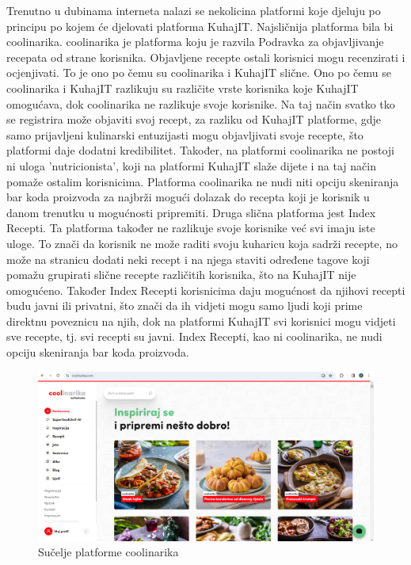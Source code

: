 		Trenutno u dubinama interneta nalazi se nekolicina platformi koje djeluju po principu po kojem će djelovati platforma KuhajIT. Najsličnija platforma bila bi coolinarika. coolinarika je platforma koju je razvila Podravka za objavljivanje recepata od strane korisnika. Objavljene recepte ostali korisnici mogu recenzirati i ocjenjivati. To je ono po čemu su coolinarika i KuhajIT slične. Ono po čemu se coolinarika i KuhajIT razlikuju su različite vrste korisnika koje KuhajIT omogućava, dok coolinarika ne razlikuje svoje korisnike. Na taj način svatko tko se registrira može objaviti svoj recept, za razliku od KuhajIT platforme, gdje samo prijavljeni kulinarski entuzijasti mogu objavljivati svoje recepte, što platformi daje dodatni kredibilitet. Također, na platformi coolinarika ne postoji ni uloga 'nutricionista', koji na platformi KuhajIT slaže dijete i na taj način pomaže ostalim korisnicima. Platforma coolinarika ne nudi niti opciju skeniranja bar koda proizvoda za najbrži mogući dolazak do recepta koji je korisnik u danom trenutku u mogućnosti pripremiti.
		Druga slična platforma jest Index Recepti. Ta platforma također ne razlikuje svoje korisnike već svi imaju iste uloge. To znači da korisnik ne može raditi svoju kuharicu koja sadrži recepte, no može na stranicu dodati neki recept i na njega staviti određene tagove koji pomažu grupirati slične recepte različitih korisnika, što na KuhajIT nije omogućeno. Također Index Recepti korisnicima daju mogućnost da njihovi recepti budu javni ili privatni, što znači da ih vidjeti mogu samo ljudi koji prime direktnu poveznicu na njih, dok na platformi KuhajIT svi korisnici mogu vidjeti sve recepte, tj. svi recepti su javni. Index Recepti, kao ni coolinarika, ne nudi opciju skeniranja bar koda proizvoda.
		
				\begin{figure}[H]
			\includegraphics[scale=0.4]{slike/coolinarika.PNG} %
			\centering
			\caption{Sučelje platforme coolinarika}
			\label{coolinarika}
		\end{figure}
	

